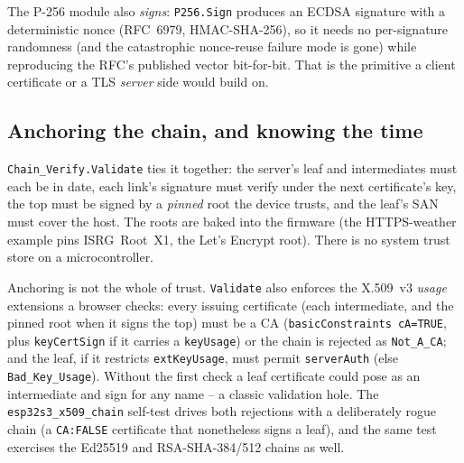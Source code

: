 The P-256 module also \emph{signs}: \texttt{P256.Sign} produces an ECDSA signature
with a deterministic nonce (RFC~6979, HMAC-SHA-256), so it needs no per-signature
randomness (and the catastrophic nonce-reuse failure mode is gone) while
reproducing the RFC's published vector bit-for-bit. That is the primitive a client
certificate or a TLS \emph{server} side would build on.

\subsection{Anchoring the chain, and knowing the time}

\texttt{Chain\_Verify.Validate} ties it together: the server's leaf and
intermediates must each be in date, each link's signature must verify under the
next certificate's key, the top must be signed by a \emph{pinned} root the device
trusts, and the leaf's SAN must cover the host. The roots are baked into the
firmware (the HTTPS-weather example pins ISRG~Root~X1, the Let's Encrypt root).
There is no system trust store on a microcontroller.

Anchoring is not the whole of trust. \texttt{Validate} also enforces the
X.509~v3 \emph{usage} extensions a browser checks: every issuing certificate
(each intermediate, and the pinned root when it signs the top) must be a CA
(\texttt{basicConstraints}~\texttt{cA=TRUE}, plus \texttt{keyCertSign} if it
carries a \texttt{keyUsage}) or the chain is rejected as \texttt{Not\_A\_CA}; and
the leaf, if it restricts \texttt{extKeyUsage}, must permit \texttt{serverAuth}
(else \texttt{Bad\_Key\_Usage}). Without the first check a leaf certificate could
pose as an intermediate and sign for any name -- a classic validation hole. The
\texttt{esp32s3\_x509\_chain} self-test drives both rejections with a deliberately
rogue chain (a \texttt{CA:FALSE} certificate that nonetheless signs a leaf), and
the same test exercises the Ed25519 and RSA-SHA-384/512 chains as well.

